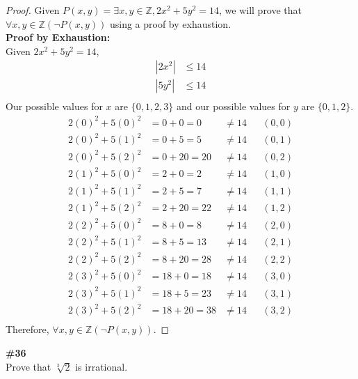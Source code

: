 \documentclass{article}
\newcommand{\problem}[1]{\textbf{\##1}\\}
\newcommand{\AllIntegers}{\mathbb{Z}}
\begin{document}
\begin{proof}
    Given \(P(x,y) = \exists x,y \in \AllIntegers, 2x^2 + 5y^2 = 14\), we will prove that \(\forall x,y \in \AllIntegers(\neg P(x,y))\) using a proof by exhaustion.\\
    \textbf{Proof by Exhaustion:}\\
    Given \(2x^2 + 5y^2 = 14\),
    \begin{align*}
        |2x^2| &\leq 14\\
        |5y^2| &\leq 14\\
    \end{align*}
    Our possible values for \(x\) are \(\{0,1,2,3\}\) and our possible values for \(y\) are \(\{0,1,2\}\).\\
    \begin{align*}
        2(0)^2 + 5(0)^2 &= 0 + 0 = 0 &\neq 14&&(0,0)\\
        2(0)^2 + 5(1)^2 &= 0 + 5 = 5 &\neq 14&&(0,1)\\
        2(0)^2 + 5(2)^2 &= 0 + 20 = 20 &\neq 14&&(0,2)\\
        2(1)^2 + 5(0)^2 &= 2 + 0 = 2 &\neq 14&&(1,0)\\
        2(1)^2 + 5(1)^2 &= 2 + 5 = 7 &\neq 14&&(1,1)\\
        2(1)^2 + 5(2)^2 &= 2 + 20 = 22 &\neq 14&&(1,2)\\
        2(2)^2 + 5(0)^2 &= 8 + 0 = 8 &\neq 14&&(2,0)\\
        2(2)^2 + 5(1)^2 &= 8 + 5 = 13 &\neq 14&&(2,1)\\
        2(2)^2 + 5(2)^2 &= 8 + 20 = 28 &\neq 14&&(2,2)\\
        2(3)^2 + 5(0)^2 &= 18 + 0 = 18 &\neq 14&&(3,0)\\
        2(3)^2 + 5(1)^2 &= 18 + 5 = 23 &\neq 14&&(3,1)\\
        2(3)^2 + 5(2)^2 &= 18 + 20 = 38 &\neq 14&&(3,2)\\
    \end{align*}
    Therefore, \(\forall x,y \in \AllIntegers(\neg P(x,y))\).
\end{proof}

\pagebreak
\problem{36}
Prove that \(\sqrt[3]{2}\) is irrational.
\end{document}
